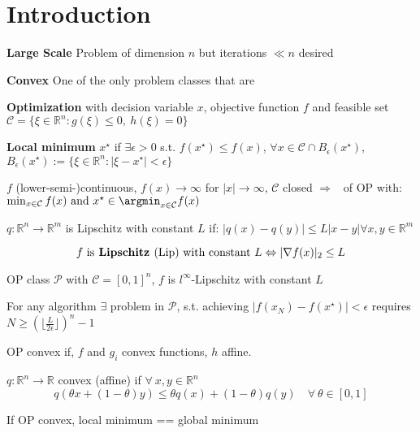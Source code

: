 \section{Introduction}

\textbf{Large Scale}
Problem of dimension $n$ but iterations $\ll n$ desired

\textbf{Convex}
One of the only problem classes that are 

\textbf{Optimization}
with decision variable $x$, objective function $f$ and
feasible set $\mathcal{C} = \{\xi \in \mathbb{R}^{n}: g(\xi)\le0,\ h(\xi)=0\}$

\textbf{Local minimum}
$x^\star$ if $\exists\epsilon>0$ s.t. $f(x^\star)\leq f(x)$,
$\forall x \in \mathcal{C} \cap B_\epsilon(x^\star)$,
$B_\epsilon(x^\star):=\{\xi\in\mathbb{R}^{n}:|\xi-x^\star|<\epsilon\}$


\begin{proposition}
	$f$ (lower-semi-)continuous,
	$f(x)\rightarrow\infty$
	for $|x|\rightarrow\infty$,
	$\mathcal{C}$ closed
	$\Rightarrow$ \exists\ of OP with:
	$\min_{x \in \mathcal{C}} f(x)\ \text{and}\ x^\star\in\argmin_{x \in \mathcal{C}}f(x)$
\end{proposition}


\begin{definition}
	$q: \mathbb{R}^{n} \rightarrow \mathbb{R}^{m}$
	is Lipschitz with constant $L$ if:
	$|q(x)-q(y)| \le L |x-y| \forall x,y \in \mathbb{R}^{m}$
\end{definition}
\vspace{-4mm}
$$f \text{ is\textbf{ Lipschitz }(Lip) with constant } L
	\Leftrightarrow
	|\nabla f(x)|_2\le L$$
\vspace{-4mm}

OP class $\mathcal{P}$ with $\mathcal{C}=[0,1]^n$,
$f$ is $l^\infty$-Lipschitz with constant $L$

\begin{proposition}
	For any algorithm $\exists$ problem in $\mathcal{P}$,
	s.t. achieving $|f(x_N )−f(x^⋆)| < \epsilon$
	requires
	$N \ge (\lfloor\frac{L}{2\epsilon}\rfloor)^n-1$
\end{proposition}

\begin{definition}
	OP convex if, $f$ and $g_i$ convex functions, $h$ affine.
\end{definition}


\begin{definition}
	$q:\mathbb{R}^{n}\rightarrow\mathbb{R}$
	convex (affine) if $\forall\ x, y \in \mathbb{R}^{n}$
	\vspace{-2mm}
	$$q(\theta x+(1−\theta)y)\le\theta q(x)+(1−\theta)q(y)\quad\forall\ \theta \in [0, 1]$$
	\vspace{-4mm}
\end{definition}
\vspace{-1mm}
\begin{proposition}
	If OP convex, local minimum == global minimum
\end{proposition}
